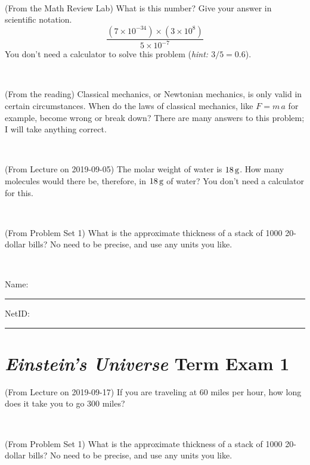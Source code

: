 \documentclass[12pt, letterpaper]{article}
\begin{document}
\vfill ~


\clearpage


\begin{problem} (From the Math Review Lab)
What is this number? Give your answer in scientific notation.
$$
\frac{(7\times10^{-34})\times(3\times10^8)}{5\times10^{-7}}
$$
You don't need a calculator to solve this problem (\textit{hint: $3/5=0.6$}).
\end{problem}


\vfill ~

\begin{problem} (From the reading)
Classical mechanics, or Newtonian mechanics, is only valid in certain
circumstances. When do the laws of classical mechanics, like $F =
m\,a$ for example, become wrong or break down? There are many answers
to this problem; I will take anything correct.
\end{problem}


\vfill ~

\begin{problem} (From Lecture on 2019-09-05)
The molar weight of water is $18\,\mathrm{g}$. How many molecules would there
be, therefore, in $18\,\mathrm{g}$ of water? You don't need a calculator for
this.
\end{problem}


\vfill ~

\begin{problem} (From Problem Set 1)
What is the approximate thickness of a stack of 1000 20-dollar bills?
No need to be precise, and use any units you like.
\end{problem}


\vfill ~


\cleardoublepage



\noindent
Name: \rule[-1ex]{0.60\textwidth}{0.1pt}
NetID: \rule[-1ex]{0.20\textwidth}{0.1pt}

\section*{\textsl{Einstein's Universe} Term Exam 1}
\setcounter{problem}{1}


\begin{problem} (From Lecture on 2019-09-17)
If you are traveling at 60 miles per hour, how long does
it take you to go 300 miles?
\end{problem}


\vfill ~

\begin{problem} (From Problem Set 1)
What is the approximate thickness of a stack of 1000 20-dollar bills?
No need to be precise, and use any units you like.
\end{problem}
\end{document}
